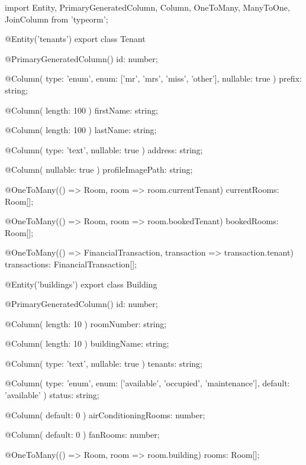 import { 
  Entity, 
  PrimaryGeneratedColumn, 
  Column, 
  OneToMany, 
  ManyToOne, 
  JoinColumn 
} from 'typeorm';

@Entity('tenants')
export class Tenant {
  @PrimaryGeneratedColumn()
  id: number;

  @Column({ 
    type: 'enum', 
    enum: ['mr', 'mrs', 'miss', 'other'], 
    nullable: true 
  })
  prefix: string;

  @Column({ length: 100 })
  firstName: string;

  @Column({ length: 100 })
  lastName: string;

  @Column({ type: 'text', nullable: true })
  address: string;

  @Column({ nullable: true })
  profileImagePath: string;

  @OneToMany(() => Room, room => room.currentTenant)
  currentRooms: Room[];

  @OneToMany(() => Room, room => room.bookedTenant)
  bookedRooms: Room[];

  @OneToMany(() => FinancialTransaction, transaction => transaction.tenant)
  transactions: FinancialTransaction[];
}

@Entity('buildings')
export class Building {
  @PrimaryGeneratedColumn()
  id: number;

  @Column({ length: 10 })
  roomNumber: string;

  @Column({ length: 10 })
  buildingName: string;

  @Column({ type: 'text', nullable: true })
  tenants: string;

  @Column({ 
    type: 'enum', 
    enum: ['available', 'occupied', 'maintenance'], 
    default: 'available' 
  })
  status: string;

  @Column({ default: 0 })
  airConditioningRooms: number;

  @Column({ default: 0 })
  fanRooms: number;

  @OneToMany(() => Room, room => room.building)
  rooms: Room[];
}

